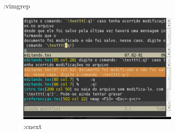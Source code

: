 \begin{frame}{:vimgrep}
	\begin{figure}[h!]
	  \caption{:cnext}
	  \centering
	    \includegraphics[width=0.7\textwidth]{sections/vimgrep/vimgrep4}
	\end{figure}
\end{frame}

